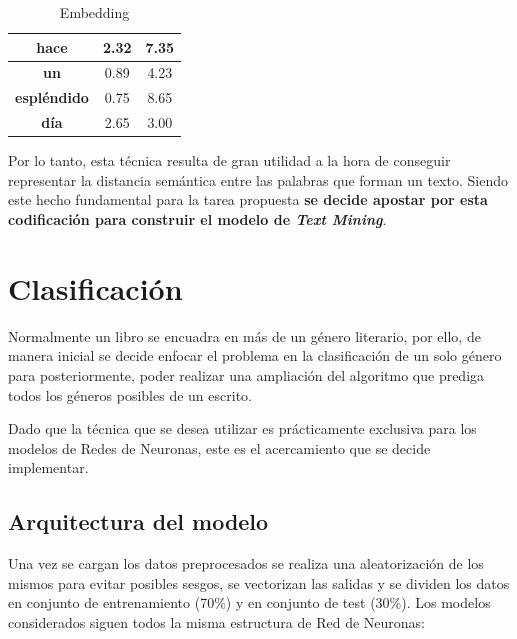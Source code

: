 \documentclass[12pt,a4paper, xcolor=table]{article}
\begin{document}
  \begin{table}[h]
        \centering
        \begin{tabular}{|c|c|c|}
        \hline
        \textbf{hace}                     & 2.32 & 7.35 \\ \hline
        \textbf{un}                       & 0.89 & 4.23 \\ \hline
        \textbf{espléndido}               & 0.75 & 8.65 \\ \hline
        \textbf{día}                      & 2.65 & 3.00 \\ \hline
        \end{tabular}
        \caption{Embedding}
            \label{table:embedding}
    \end{table}

Por lo tanto, esta técnica resulta de gran utilidad a la hora de conseguir representar la distancia semántica entre las palabras que forman un texto. Siendo este hecho fundamental para la tarea propuesta \textbf{se decide apostar por esta codificación para construir el modelo de \textit{Text Mining}}.

\newpage

\section{Clasificación}

Normalmente un libro se encuadra en más de un género literario, por ello, de manera inicial se decide enfocar el problema en la clasificación de un solo género para posteriormente, poder realizar una ampliación del algoritmo que prediga todos los géneros posibles de un escrito.

\vspace{2mm}

Dado que la técnica que se desea utilizar es prácticamente exclusiva para los modelos de Redes de Neuronas, este es el acercamiento que se decide implementar.

\subsection{Arquitectura del modelo}

Una vez se cargan los datos preprocesados se realiza una aleatorización de los mismos para evitar posibles sesgos, se vectorizan las salidas y se dividen los datos en conjunto de  entrenamiento (70\%) y en conjunto de test (30\%). Los modelos considerados siguen todos la misma estructura de Red de Neuronas:
\end{document}
